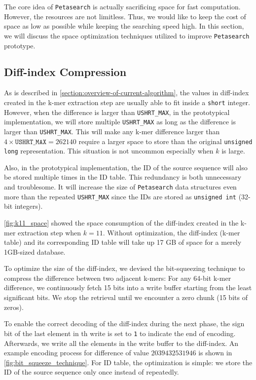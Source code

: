 The core idea of \texttt{Petasearch} is actually sacrificing space for fast computation.
However, the resources are not limitless.
Thus, we would like to keep the cost of space as low as possible while keeping the searching speed high.
In this section, we will discuss the space optimization techniques utilized to improve \texttt{Petasearch} prototype.

\subsection{Diff-index Compression} \label{section:diff-index_compression}

As is described in \cref{section:overview-of-current-algorithm}, the values in diff-index created in the k-mer extraction step are usually able to fit inside a \texttt{short} integer.
However, when the difference is larger than \texttt{USHRT\_MAX}, in the prototypical implementation, we will store multiple \texttt{USHRT\_MAX} as long as the difference is larger than \texttt{USHRT\_MAX}.
This will make any k-mer difference larger than $4 \times \mathtt{USHRT\_MAX} = 262140$ require a larger space to store than the original \texttt{unsigned long} representation.
This situation is not uncommon especially when $k$ is large.

Also, in the prototypical implementation, the ID of the source sequence will also be stored multiple times in the ID table.
This redundancy is both unnecessary and troublesome.
It will increase the size of \texttt{Petasearch} data structures even more than the repeated \texttt{USHRT\_MAX} since the IDs are stored as \texttt{unsigned int} (32-bit integers).

\autoref{fig:k11_space} showed the space consumption of the diff-index created in the k-mer extraction step when $k = 11$.
Without optimization, the diff-index (k-mer table) and its corresponding ID table will take up 17 GB of space for a merely 1GB-sized database.

To optimize the size of the diff-index, we devised the bit-squeezing technique to compress the difference between two adjacent k-mers:
For any 64-bit k-mer difference, we continuously fetch 15 bits into a write buffer starting from the least significant bits.
We stop the retrieval until we encounter a zero chunk (15 bits of zeros).

To enable the correct decoding of the diff-index during the next phase, the sign bit of the last element in th write is set to \texttt{1} to indicate the end of encoding.
Afterwards, we write all the elements in the write buffer to the diff-index.
An example encoding process for difference of value $2039432531946$ is shown in \autoref{fig:bit_squeeze_technique}.
For ID table, the optimization is simple: we store the ID of the source sequence only once instead of repeatedly.

